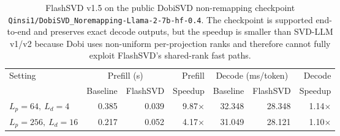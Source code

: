 \begin{table}[t]
\centering
\small
\caption{FlashSVD v1.5 on the public DobiSVD non-remapping checkpoint
\texttt{Qinsi1/DobiSVD\_Noremapping-Llama-2-7b-hf-0.4}. The checkpoint is supported
end-to-end and preserves exact decode outputs, but the speedup is smaller than
SVD-LLM v1/v2 because Dobi uses non-uniform per-projection ranks and therefore
cannot fully exploit FlashSVD's shared-rank fast paths.}
\label{tab:dobisvd-small}
\begin{tabular}{lrrrrrr}
\toprule
Setting & \multicolumn{2}{c}{Prefill (s)} & Prefill & \multicolumn{2}{c}{Decode (ms/token)} & Decode \\
\cmidrule(lr){2-3}\cmidrule(lr){5-6}
 & Baseline & FlashSVD & Speedup & Baseline & FlashSVD & Speedup \\
\midrule
$L_p{=}64,\ L_d{=}4$   & 0.385 & 0.039 & 9.87$\times$ & 32.348 & 28.348 & 1.14$\times$ \\
$L_p{=}256,\ L_d{=}16$ & 0.217 & 0.052 & 4.17$\times$ & 31.049 & 28.121 & 1.10$\times$ \\
\bottomrule
\end{tabular}
\end{table}
